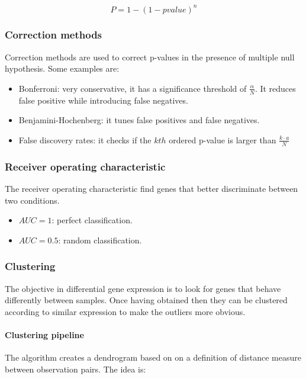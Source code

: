 			$$P = 1-(1-pvalue)^n$$

		\subsubsection{Correction methods}
		Correction methods are used to correct p-values in the presence of multiple null hypothesis.
		Some examples are:

		\begin{multicols}{2}
			\begin{itemize}
				\item Bonferroni: very conservative, it has a significance threshold of $\frac{\alpha}{N}$.
					It reduces false positive while introducing false negatives.
				\item Benjamini-Hochenberg: it tunes false positives and false negatives.
				\item False discovery rates: it checks if the $kth$ ordered p-value is larger than $\frac{k\cdot a}{N}$
			\end{itemize}
		\end{multicols}

		\subsubsection{Receiver operating characteristic}
		The receiver operating characteristic find genes that better discriminate between two conditions.

		\begin{multicols}{2}
			\begin{itemize}
				\item $AUC=1$: perfect classification.
				\item $AUC = 0.5$: random classification.
			\end{itemize}
		\end{multicols}

		\subsubsection{Clustering}
		The objective in differential gene expression is to look for genes that behave differently between samples.
		Once having obtained then they can be clustered according to similar expression to make the outliers more obvious.

			\paragraph{Clustering pipeline}
			The algorithm creates a dendrogram based on on a definition of distance measure between observation pairs.
			The idea is:

